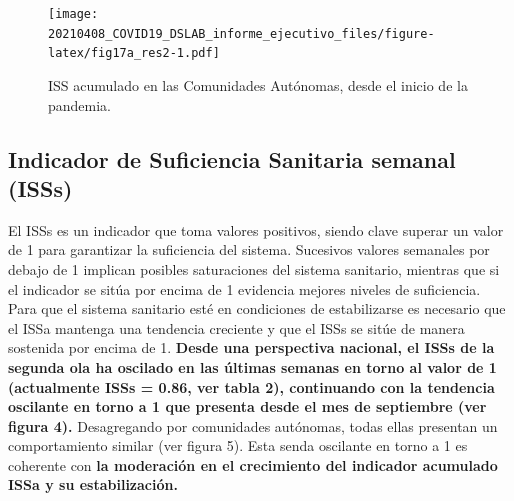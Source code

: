 \documentclass[
  11pt,
]{article}
\begin{document}
\vspace{0.2cm}

\begin{figure}
\centering
\texttt{[image: 20210408\_COVID19\_DSLAB\_informe\_ejecutivo\_files/figure-latex/fig17a\_res2-1.pdf]}
\caption{\label{fig:fig17a_res} ISS acumulado en las Comunidades
Autónomas, desde el inicio de la pandemia.}
\end{figure}

\newpage
\setcounter{page}{6}

\hypertarget{indicador-de-suficiencia-sanitaria-semanal-isss}{%
\subsection{Indicador de Suficiencia Sanitaria semanal
(ISSs)}\label{indicador-de-suficiencia-sanitaria-semanal-isss}}

El ISSs es un indicador que toma valores positivos, siendo clave superar
un valor de 1 para garantizar la suficiencia del sistema. Sucesivos
valores semanales por debajo de 1 implican posibles saturaciones del
sistema sanitario, mientras que si el indicador se sitúa por encima de 1
evidencia mejores niveles de suficiencia. Para que el sistema sanitario
esté en condiciones de estabilizarse es necesario que el ISSa mantenga
una tendencia creciente y que el ISSs se sitúe de manera sostenida por
encima de 1. \textbf{Desde una perspectiva nacional, el ISSs de la
segunda ola ha oscilado en las últimas semanas en torno al valor de 1
(actualmente ISSs = 0.86, ver tabla 2), continuando con la tendencia
oscilante en torno a 1 que presenta desde el mes de septiembre (ver
figura 4).} Desagregando por comunidades autónomas, todas ellas
presentan un comportamiento similar (ver figura 5). Esta senda oscilante
en torno a 1 es coherente con \textbf{la moderación en el crecimiento
del indicador acumulado ISSa y su estabilización. }
\end{document}
